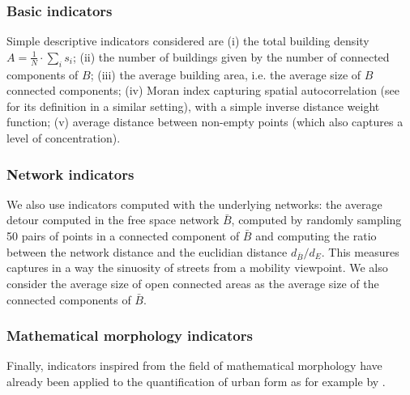 \documentclass[letterpaper]{article}
\begin{document}
\subsubsection{Basic indicators}
Simple descriptive indicators considered are (i) the total building density $A = \frac{1}{N}\cdot \sum_i s_i$; (ii) the number of buildings given by the number of connected components of $B$; (iii) the average building area, i.e. the average size of $B$ connected components; (iv) Moran index capturing spatial autocorrelation (see \cite{raimbault2018calibration} for its definition in a similar setting), with a simple inverse distance weight function; (v) average distance between non-empty points (which also captures a level of concentration).


\subsubsection{Network indicators}

We also use indicators computed with the underlying networks: the average detour computed in the free space network $\bar{B}$, computed by randomly sampling 50 pairs of points in a connected component of $\bar{B}$ and computing the ratio between the network distance and the euclidian distance $d_{\bar{B}}/d_E$. This measures captures in a way the sinuosity of streets from a mobility viewpoint. We also consider the average size of open connected areas as the average size of the connected components of $\bar{B}$.


\subsubsection{Mathematical morphology indicators}

Finally, indicators inspired from the field of mathematical morphology \citep{serra1983image} have already been applied to the quantification of urban form as for example by \cite{pesaresi2003recognizing}.











\end{document}
